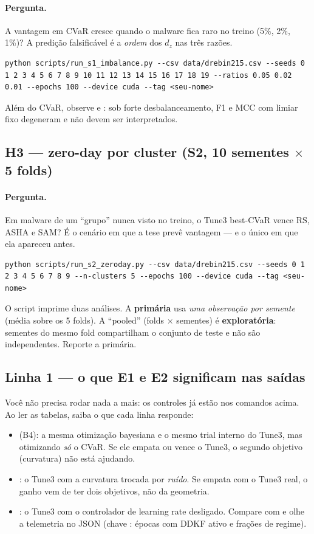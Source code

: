 \paragraph{Pergunta.} A vantagem em CVaR cresce quando o malware fica raro no treino (5\%, 2\%, 1\%)? A predição falsificável é a \emph{ordem} dos $d_z$ nas três razões.
\begin{lstlisting}
python scripts/run_s1_imbalance.py --csv data/drebin215.csv --seeds 0 1 2 3 4 5 6 7 8 9 10 11 12 13 14 15 16 17 18 19 --ratios 0.05 0.02 0.01 --epochs 100 --device cuda --tag <seu-nome>
\end{lstlisting}
Além do CVaR, observe  e : sob forte desbalanceamento, F1 e MCC com limiar fixo degeneram e não devem ser interpretados.

\subsection{H3 --- zero-day por cluster (S2, 10 sementes $\times$ 5 folds)}
\paragraph{Pergunta.} Em malware de um ``grupo'' nunca visto no treino, o Tune3 best-CVaR vence RS, ASHA e SAM? É o cenário em que a tese prevê vantagem --- e o único em que ela apareceu antes.
\begin{lstlisting}
python scripts/run_s2_zeroday.py --csv data/drebin215.csv --seeds 0 1 2 3 4 5 6 7 8 9 --n-clusters 5 --epochs 100 --device cuda --tag <seu-nome>
\end{lstlisting}
O script imprime duas análises. A \textbf{primária} usa \emph{uma observação por semente} (média sobre os 5 folds). A ``pooled'' (folds $\times$ sementes) é \textbf{exploratória}: sementes do mesmo fold compartilham o conjunto de teste e não são independentes. Reporte a primária.

\subsection{Linha 1 --- o que E1 e E2 significam nas saídas}
Você não precisa rodar nada a mais: os controles já estão nos comandos acima. Ao ler as tabelas, saiba o que cada linha responde:
\begin{itemize}
\item {} (B4): a mesma otimização bayesiana e o mesmo trial interno do Tune3, mas otimizando \emph{só} o CVaR. Se ele empata ou vence o Tune3, o segundo objetivo (curvatura) não está ajudando.
\item {}: o Tune3 com a curvatura trocada por \emph{ruído}. Se empata com o Tune3 real, o ganho vem de ter dois objetivos, não da geometria.
\item {}: o Tune3 com o controlador de learning rate desligado. Compare com  e olhe a telemetria no JSON (chave : épocas com DDKF ativo e frações de regime).
\end{itemize}

